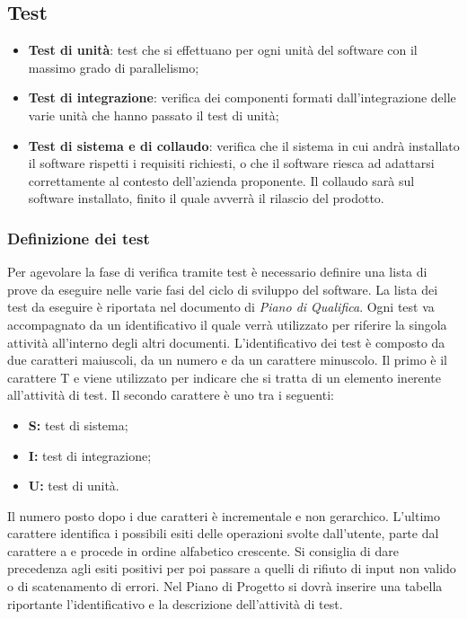   	\subsection{Test}
  	\begin{itemize}
  	
  	
  \item \textbf{Test di unità}: test che si effettuano per ogni unità del software con il massimo grado di parallelismo;
  \item \textbf{Test di integrazione}: verifica dei componenti formati dall’integrazione delle varie unità che hanno passato il test di unità;
  \item \textbf{Test di sistema e di collaudo}: verifica che il sistema in cui andrà installato il software rispetti i requisiti richiesti, o che il software riesca ad adattarsi correttamente al contesto dell’azienda proponente. Il collaudo sarà sul software installato, finito il quale avverrà il rilascio del prodotto.
  \end{itemize}
  \subsubsection{Definizione dei test}
  Per agevolare la fase di verifica tramite test è necessario definire una lista di prove da eseguire nelle varie fasi del ciclo di sviluppo del software.
  La lista dei test da eseguire è riportata nel documento di \emph{Piano di Qualifica}. Ogni test va accompagnato da un identificativo il quale verrà utilizzato per riferire
  la singola attività all’interno degli altri documenti.  L’identificativo dei test è composto da due caratteri maiuscoli, da un numero e da un carattere minuscolo. Il primo è il carattere T e viene utilizzato per indicare che si tratta di un elemento inerente all’attività di test. Il secondo carattere è uno tra i seguenti:
  \begin{itemize} 
  \item \textbf{S:} test di sistema;
  \item \textbf{I:} test di integrazione;
  \item \textbf{U:} test di unità.
  \end{itemize}
  Il numero posto dopo i due caratteri è incrementale e non gerarchico. L’ultimo carattere identifica i possibili esiti delle operazioni svolte dall’utente, parte dal carattere a e procede in ordine alfabetico crescente. Si consiglia di dare precedenza agli esiti positivi per poi passare a quelli di rifiuto di input non valido o di scatenamento di errori.
  Nel Piano di Progetto si dovrà inserire una tabella riportante l’identificativo e la descrizione dell’attività di test.
  

